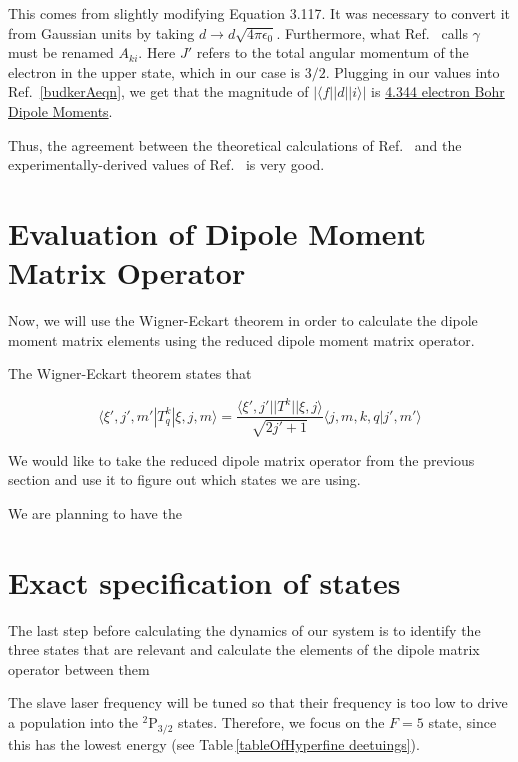 This comes from slightly modifying Equation 3.117. It was necessary to convert it from Gaussian units by taking $d\rightarrow d \sqrt{4 \pi \epsilon_0}$. Furthermore, what Ref.\ \cite{demilleBudkerKimball} calls $\gamma$ must be renamed $A_{ki}$. Here $J'$ refers to the total angular momentum of the electron in the upper state, which in our case is $3/2$. Plugging in our values into Ref.\ \ref{budkerAeqn}, we get that the magnitude of $|\langle f ||d|| i \rangle|$ is \href{http://www.wolframalpha.com/input/?i=sqrt%283*hbar*c%5E3%2F%284*%282*pi*c%2F407.771+nm%29%5E3%29*4*pi*epsilon_0*4*1.41e8*1%2Fs%29}{4.344 electron Bohr Dipole Moments}.

Thus, the agreement between the theoretical calculations of Ref.\ \cite{safronova2photon} and the experimentally-derived values of Ref.\ \cite{NISTasd} is very good.  

\section{Evaluation of Dipole Moment Matrix Operator}

Now, we will use the Wigner-Eckart theorem in order to calculate the dipole moment matrix elements using the reduced dipole moment matrix operator.

The Wigner-Eckart theorem states that 

\begin{equation}
\langle \xi',j',m'|T^k_q|\xi,j,m\rangle = \frac{\langle \xi',j'||T^k||\xi,j\rangle}{\sqrt{2j'+1}}\langle j,m,k,q|j',m'\rangle
\end{equation}

We would like to take the reduced dipole matrix operator from the previous section and use it to figure out which states we are using. 

We are planning to have the 

\section{Exact specification of states}

The last step before calculating the dynamics of our system is to identify the three states that are relevant and calculate the elements of the dipole matrix operator between them

The slave laser frequency will be tuned so that their frequency is too low to drive a population into the $^2$P$_{3/2}$ states. Therefore, we focus on the $F=5$ state, since this has the lowest energy (see Table\,\ref{tableOfHyperfine deetuings}).

